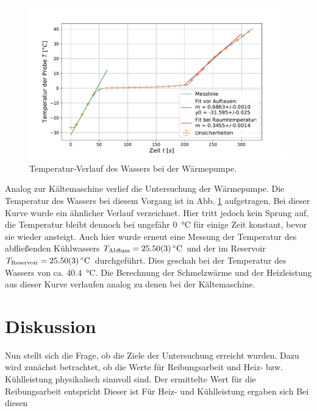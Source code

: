 	\begin{figure}[ht]
		\centering
		\includegraphics[width=\textwidth]{data/warm_machen.pdf}
		\caption{Temperatur-Verlauf des Wassers bei der Wärmepumpe.}
		\label{fig:Wärmepumpe}	
	\end{figure}
	Analog zur Kältemaschine verlief die Untersuchung der Wärmepumpe. 
	Die Temperatur des Wassers bei diesem Vorgang ist in Abb. \ref{fig:Wärmepumpe} aufgetragen.
	Bei dieser Kurve wurde ein ähnlicher Verlauf verzeichnet.
	Hier tritt jedoch kein Sprung auf, die Temperatur bleibt dennoch  bei ungefähr \SI{0}{\celsius} für einige Zeit konstant, bevor sie wieder ansteigt.
	Auch hier wurde erneut eine Messung der Temperatur des abfließenden Kühlwassers $T_\text{Abfluss} = \SI{25,5+-0,03}{\celsius}$ und der im Reservoir $T_\text{Reservoir} = \SI{25,5+-0,03}{\celsius}$ durchgeführt.
	Dies geschah bei der Temperatur des Wassers von ca. \SI{40,4}{\celsius}.
	Die Berechnung der Schmelzwärme und der Heizleistung aus dieser Kurve verlaufen analog zu denen bei der Kältemaschine.
	
\section{Diskussion}
	
	Nun stellt sich die Frage, ob die Ziele der Untersuchung erreicht wurden.
	Dazu wird zunächst betrachtet, ob die Werte für Reibungsarbeit und Heiz- bzw. Kühlleistung physikalisch sinnvoll sind.
	Der ermittelte Wert für die Reibungsarbeit entspricht %
	Dieser ist %
	Für Heiz- und Kühlleistung ergaben sich %
	Bei diesen %
	
